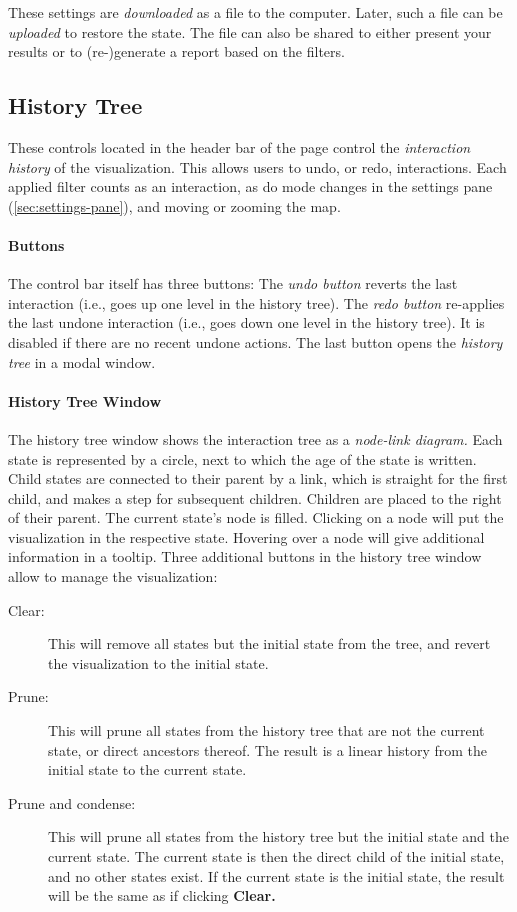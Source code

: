 These settings are \emph{downloaded} as a file to the computer.
Later, such a file can be \emph{uploaded} to restore the state.
The file can also be shared to either present your results or to (re-)generate a report based on the filters.


\subsection{History Tree}
\label{sec:history-tree}

These controls located in the header bar of the page control the \emph{interaction history} of the visualization.
This allows users to undo, or redo, interactions.
Each applied filter counts as an interaction, as do mode changes in the settings pane (\cref{sec:settings-pane}), and moving or zooming the map.

\paragraph{Buttons}
The control bar itself has three buttons:
The \emph{undo button} reverts the last interaction (i.e., goes up one level in the history tree).
The \emph{redo button} re-applies the last undone interaction (i.e., goes down one level in the history tree).
It is disabled if there are no recent undone actions.
The last button opens the \emph{history tree} in a modal window.

\paragraph{History Tree Window}
The history tree window shows the interaction tree as a \emph{node-link diagram.}
Each state is represented by a circle, next to which the age of the state is written.
Child states are connected to their parent by a link, which is straight for the first child, and makes a step for subsequent children.
Children are placed to the right of their parent.
The current state's node is filled.
Clicking on a node will put the visualization in the respective state.
Hovering over a node will give additional information in a tooltip.
Three additional buttons in the history tree window allow to manage the visualization:

\begin{description}
  \item [Clear:]
    This will remove all states but the initial state from the tree, and revert the visualization to the initial state.
  \item [Prune:]
    This will prune all states from the history tree that are not the current state, or direct ancestors thereof.
    The result is a linear history from the initial state to the current state.
  \item [Prune and condense:]
    This will prune all states from the history tree but the initial state and the current state.
    The current state is then the direct child of the initial state, and no other states exist.
    If the current state is the initial state, the result will be the same as if clicking \textbf{Clear.}
\end{description}


